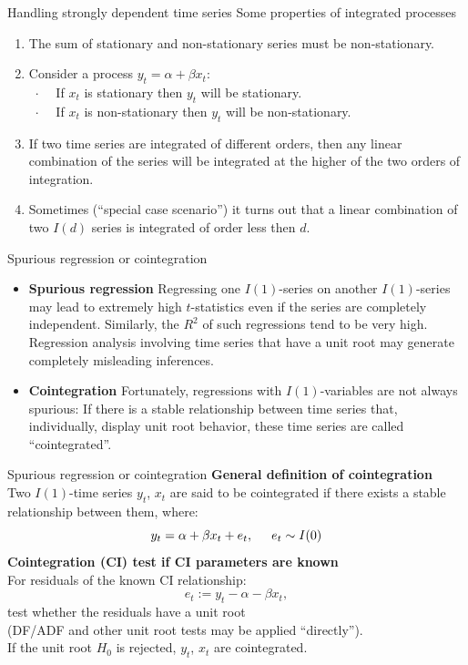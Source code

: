 \documentclass{beamer}
\begin{document}
\begin{frame}{Handling strongly dependent time series}
Some properties of integrated processes
\medskip
\begin{enumerate}
\item The sum of stationary and non-stationary series must be non-stationary.
\medskip
\item Consider a process $y_t=\alpha + \beta x_t$:\\
~$\cdot$~~ If $x_t$ is stationary then $y_t$ will be stationary. \\
~$\cdot$~~ If $x_t$ is non-stationary then $y_t$ will be non-stationary. 
\medskip
\item If two time series are integrated of different orders, then any linear combination of the series will be integrated at the higher of the two orders of integration. 
\medskip
\item Sometimes (``special case scenario'') it turns out that a linear combination of two $I(d)$ series is integrated of order less then $d$. 
\end{enumerate}
\end{frame}
\begin{frame}{Spurious regression or cointegration}
\begin{itemize}
\item \textbf{Spurious regression}
 Regressing one $I(1)$-series on another $I(1)$-series may lead to extremely
high $t$-statistics even if the series are completely independent. Similarly, the $R^2$ of such regressions tend to be very high. \\Regression analysis involving time series that have a unit root may generate completely misleading inferences.
\vspace{0.5cm}
\item \textbf{Cointegration} Fortunately, regressions with $I(1)$-variables are not always spurious:
If there is a stable relationship between time series that, individually, display unit root behavior, these time series are called ``cointegrated''.
\end{itemize}
\end{frame}
\begin{frame}{Spurious regression or cointegration}
\textbf{General definition of cointegration}\\
\vspace{0.5cm}
Two $I(1)$-time series $y_t$, $x_t$ are said to be cointegrated if there exists a stable relationship between them, where:
$$ y_t=\alpha+\beta x_t + e_t, 
\hspace{0.5cm} e_t \sim I(0)$$
\textbf{Cointegration (CI) test if CI parameters are known}\\
\vspace{0.5cm}
For residuals of the known CI relationship:
$$e_t := y_t-\alpha-\beta x_t, $$
test whether the residuals have a unit root \\(DF/ADF and other unit root tests may be applied ``directly''). \\ \medskip If the unit root $H_0$ is rejected, $y_t$, $x_t$ are cointegrated. 
\end{frame}
\end{document}
